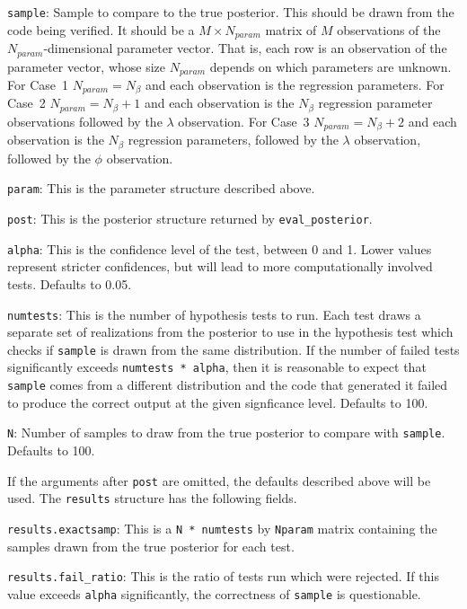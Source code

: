 \documentclass{book}
\begin{document}
\vspace{.1in}
{\tt sample}: Sample to compare to the true posterior. This should be drawn from the code being verified. It should be
a $M \times N_{param}$ matrix of $M$ observations of the $N_{param}$-dimensional parameter vector. That is, each
row is an observation of the parameter vector, whose size $N_{param}$ depends on which parameters are unknown. 
For Case~1 $N_{param} = N_\beta$ and each observation is the regression parameters. For Case~2 
$N_{param} = N_\beta + 1$ and each observation is the $N_\beta$ regression parameter observations followed by the 
$\lambda$ observation. For Case~3 $N_{param} = N_\beta + 2$ and each observation is the $N_\beta$ regression 
parameters, followed by the $\lambda$ observation, followed by the $\phi$ observation. 

{\tt param}: This is the parameter structure described above.

{\tt post}: This is the posterior structure returned by {\tt eval\_posterior}.

{\tt alpha}: This is the confidence level of the test, between 0 and 1. Lower values represent stricter confidences, but
will lead to more computationally involved tests. Defaults to 0.05. 

{\tt numtests}: This is the number of hypothesis tests to run. Each test draws a separate set of realizations from the
posterior to use in the hypothesis test which checks if {\tt sample} is drawn from the same distribution. If the number
of failed tests significantly exceeds {\tt numtests * alpha}, then it is reasonable to expect that {\tt sample}
comes from a different distribution and the code that generated it failed to produce the correct output at the given
signficance level. Defaults to 100.

{\tt N}: Number of samples to draw from the true posterior to compare with {\tt sample}. Defaults to 100. 

If the arguments after {\tt post} are omitted, the defaults described above will be used. The {\tt results} structure
has the following fields. 

\vspace{.1in}
{\tt results.exactsamp}: This is a {\tt N * numtests} by {\tt Nparam} matrix containing the samples drawn from the
true posterior for each test. 

{\tt results.fail\_ratio}: This is the ratio of tests run which were rejected. If this value exceeds {\tt alpha} significantly,
the correctness of {\tt sample} is questionable. 
\end{document}
